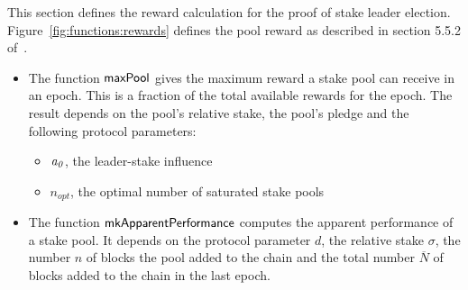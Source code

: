 This section defines the reward calculation for the proof of stake leader election.
Figure~\ref{fig:functions:rewards} defines the pool reward as described in section
5.5.2 of~\cite{delegation_design}.

\begin{itemize}
  \item The function $\mathsf{maxPool}$ gives the maximum reward a stake pool can receive in an epoch.
    This is a fraction of the total available rewards for the epoch.
    The result depends on the pool's relative stake, the pool's pledge and the following
    protocol parameters:
    \begin{itemize}
      \item $\mathit{a_0}$, the leader-stake influence
      \item $n_{opt}$, the optimal number of saturated stake pools
    \end{itemize}
  \item The function $\mathsf{mkApparentPerformance}$ computes the apparent performance of a stake pool.
    It depends on the protocol parameter $d$, the relative stake $\sigma$, the number $n$ of blocks
    the pool added to the chain and the total number $\overline{N}$ of blocks added to the chain in
    the last epoch.

\end{itemize}

